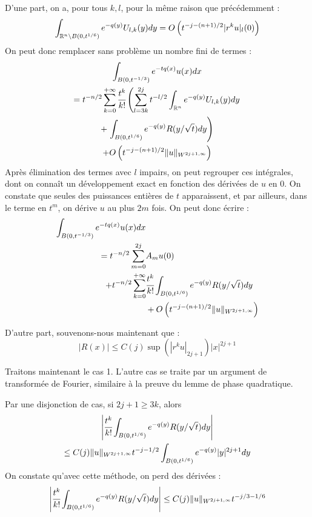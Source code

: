 \begin{preuve}
D'une part, on a, pour tous $k,l$, pour la même raison que précédemment :
\begin{equation*}
  \int_{\mathbb{R}^n \setminus B(0,t^{1/6})}e^{-q(y)}U_{l,k}(y)dy = O\left(t^{-j-(n+1)/2}|r^ku|_{l}(0)\right)
\end{equation*}
\noindent On peut donc remplacer sans problème un nombre fini de termes :
\begin{multline*}
\int_{B(0,t^{-1/3})}e^{-tq(x)}u(x)dx \\= t^{-n/2}\sum_{k=0}^{+\infty}\cfrac {t^k}{k!}\left(\sum_{l=3k}^{2j} t^{-l/2}\int_{\mathbb{R}^n}e^{-q(y)}U_{l,k}(y)dy\right. \\+ \left.\int_{B(0,t^{1/6})}e^{-q(y)}R(y/\sqrt{t})dy\right) \\+ O\left(t^{-j-(n+1)/2}\|u\|_{W^{2j+1,\infty}}\right)
\end{multline*}
\noindent Après élimination des termes avec $l$ impairs, on peut regrouper ces intégrales, dont on connaît un développement exact en fonction des dérivées de $u$ en $0$. On constate que seules des puissances entières de $t$ apparaissent, et par ailleurs, dans le terme en $t^m$, on dérive $u$ au plus $2m$ fois. On peut donc écrire :
\begin{align*}
\int_{B(0,t^{-1/3})}e^{-tq(x)}u(x)dx& \\= t^{-n/2}\sum_{m=0}^{2j} & A_mu(0) \\+ t^{-n/2}\sum_{k=0}^{+\infty}&\cfrac{t^k}{k!}\int_{B(0,t^{1/6})}e^{-q(y)}  R(y/\sqrt{t})dy \\&+ O\left(t^{-j-(n+1)/2}\|u\|_{W^{2j+1,\infty}}\right)
\end{align*}

D'autre part, souvenons-nous maintenant que :
\begin{equation*}
  |R(x)| \leq C(j) \sup (|r^ku|_{2j+1}) |x|^{2j+1}
\end{equation*}

Traitons maintenant le cas 1. L'autre cas se traite par un argument de transformée de Fourier, similaire à la preuve du lemme de phase quadratique. 

Par une disjonction de cas, si $2j+1 \geq 3k$, alors
\begin{multline*}
  \left|\cfrac{t^k}{k!}\int_{B(0,t^{1/6})}e^{-q(y)}R(y/\sqrt{t})dy\right| \\\leq C(j)\|u\|_{W^{2j+1,\infty}}t^{-j-1/2}\int_{B(0,t^{1/6})}e^{-q(y)}|y|^{2j+1}dy
\end{multline*}
\noindent On constate qu'avec cette méthode, on perd des dérivées :
\begin{equation*}
  \left|\cfrac{t^k}{k!}\int_{B(0,t^{1/6})}e^{-q(y)}R(y/\sqrt{t})dy\right| \leq C(j)\|u\|_{W^{2j+1,\infty}}t^{-j/3-1/6}
\end{equation*}


\end{preuve}
